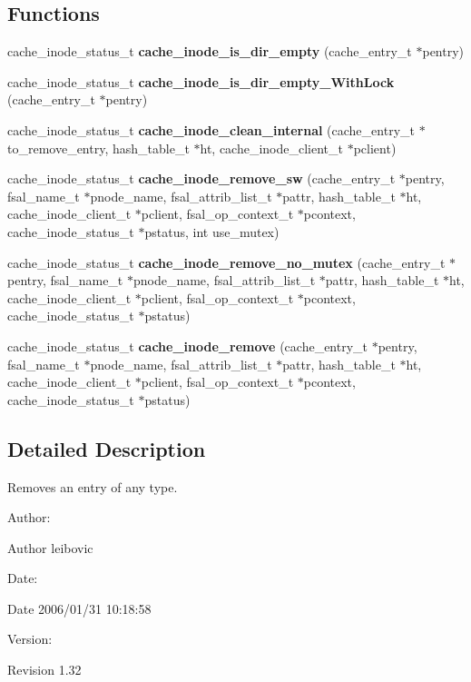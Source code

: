 \subsection*{Functions}
\begin{CompactItemize}
\item 
cache\_\-inode\_\-status\_\-t {\bf cache\_\-inode\_\-is\_\-dir\_\-empty} (cache\_\-entry\_\-t $\ast$pentry)
\item 
cache\_\-inode\_\-status\_\-t {\bf cache\_\-inode\_\-is\_\-dir\_\-empty\_\-WithLock} (cache\_\-entry\_\-t $\ast$pentry)
\item 
cache\_\-inode\_\-status\_\-t {\bf cache\_\-inode\_\-clean\_\-internal} (cache\_\-entry\_\-t $\ast$to\_\-remove\_\-entry, hash\_\-table\_\-t $\ast$ht, cache\_\-inode\_\-client\_\-t $\ast$pclient)
\item 
cache\_\-inode\_\-status\_\-t {\bf cache\_\-inode\_\-remove\_\-sw} (cache\_\-entry\_\-t $\ast$pentry, fsal\_\-name\_\-t $\ast$pnode\_\-name, fsal\_\-attrib\_\-list\_\-t $\ast$pattr, hash\_\-table\_\-t $\ast$ht, cache\_\-inode\_\-client\_\-t $\ast$pclient, fsal\_\-op\_\-context\_\-t $\ast$pcontext, cache\_\-inode\_\-status\_\-t $\ast$pstatus, int use\_\-mutex)
\item 
cache\_\-inode\_\-status\_\-t {\bf cache\_\-inode\_\-remove\_\-no\_\-mutex} (cache\_\-entry\_\-t $\ast$pentry, fsal\_\-name\_\-t $\ast$pnode\_\-name, fsal\_\-attrib\_\-list\_\-t $\ast$pattr, hash\_\-table\_\-t $\ast$ht, cache\_\-inode\_\-client\_\-t $\ast$pclient, fsal\_\-op\_\-context\_\-t $\ast$pcontext, cache\_\-inode\_\-status\_\-t $\ast$pstatus)
\item 
cache\_\-inode\_\-status\_\-t {\bf cache\_\-inode\_\-remove} (cache\_\-entry\_\-t $\ast$pentry, fsal\_\-name\_\-t $\ast$pnode\_\-name, fsal\_\-attrib\_\-list\_\-t $\ast$pattr, hash\_\-table\_\-t $\ast$ht, cache\_\-inode\_\-client\_\-t $\ast$pclient, fsal\_\-op\_\-context\_\-t $\ast$pcontext, cache\_\-inode\_\-status\_\-t $\ast$pstatus)
\end{CompactItemize}


\subsection{Detailed Description}
Removes an entry of any type. 

\begin{Desc}
\item[Author:]\end{Desc}
\begin{Desc}
\item[Author]leibovic \end{Desc}
\begin{Desc}
\item[Date:]\end{Desc}
\begin{Desc}
\item[Date]2006/01/31 10:18:58 \end{Desc}
\begin{Desc}
\item[Version:]\end{Desc}
\begin{Desc}
\item[Revision]1.32 \end{Desc}


